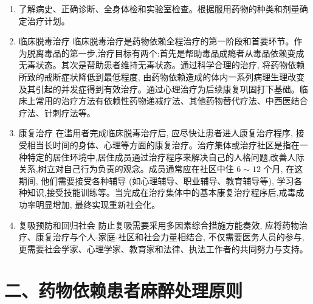 \documentclass[10pt]{article}
\begin{document}
\begin{enumerate}
  \item 了解病史、正确诊断、全身体检和实验室检查。根据服用药物的种类和剂量确定治疗计划。

  \item 临床脱毒治疗 临床脱毒治疗是药物依赖全程治疗的第一阶段和首要环节。作为脱离毒品的第一步,治疗目标有两个:首先是帮助毒品成瘾者从毒品依赖变成无毒状态。其次是帮助患者维持无毒状态。通过科学合理的治疗, 将药物依赖所致的戒断症状降低到最低程度, 由药物依赖造成的体内一系列病理生理改变及其引起的并发症得到有效治疗。通过心理治疗为后续康复巩固打下基础。临床上常用的治疗方法有依赖性药物递减疗法、其他药物替代疗法、中西医结合疗法、针刺疗法等。

  \item 康复治疗 在滥用者完成临床脱毒治疗后, 应尽快让患者进人康复治疗程序, 接受相当长时间的身体、心理等方面的康复治疗。治疗集体或治疗社区是指在一种特定的居住环境中,居住成员通过治疗程序来解决自己的人格问题,改善人际关系,树立对自己行为负责的观念。成员通常应在社区中住 $6 \sim 12$ 个月, 在这期间, 他们需要接受各种辅导 (如心理辅导、职业辅导、教育辅导等), 学习各种知识,接受技能训练等。当完成在治疗集体中的基本康复治疗程序后,戒毒成功率明显增加, 最终实现重新社会化。

  \item 复吸预防和回归社会 防止复吸需要采用多因素综合措施方能奏效, 应将药物治疗、康复治疗与个人-家庭-社区和社会力量相结合, 不仅需要医务人员的参与, 更需要社会学家、心理学家、教育家和法律、执法工作者的共同努力与支持。

\end{enumerate}

\section*{二、药物依赖患者麻醉处理原则}
\end{document}
